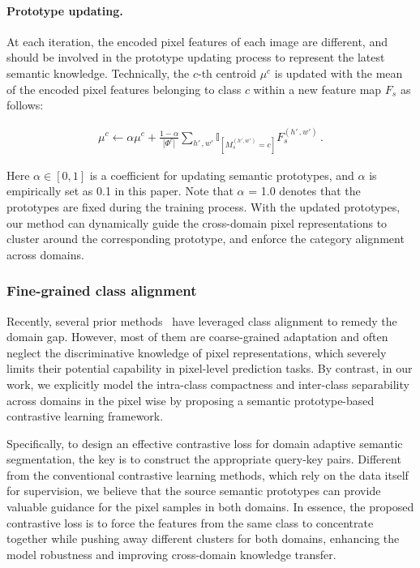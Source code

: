 \documentclass[runningheads]{llncs}
\begin{document}
\paragraph{Prototype updating.} At each iteration, the encoded pixel features of each image are different, and should be involved in the prototype updating process to represent the latest semantic knowledge. Technically, the $c$-th centroid $\mu^c$ is updated with the mean of the encoded pixel features belonging to class $c$ within a new feature map $F_{s}$ as follows:\begin{small}
\end{small}\begin{small}
    \begin{align}
        \mu^c \leftarrow \alpha \mu^c + \frac{1 - \alpha}{|\Phi^c|} \sum_{h'\,, w'} \mathbb{I}_{[M_s^{(h',w')}=c]} F_{s}^{(h'\,, w')}\,.
        \label{eq:semantic_prototype_update}
    \end{align}
\end{small}Here $\alpha \in [0,1]$ is a coefficient for updating semantic prototypes, and $\alpha$ is empirically set as 0.1 in this paper. Note that $\alpha$ = 1.0 denotes that the prototypes are fixed during the training process. With the updated prototypes, our method can dynamically guide the cross-domain pixel representations to cluster around the corresponding prototype, and enforce the category alignment across domains.

\subsubsection{Fine-grained class alignment}
\label{sec:alignment}
Recently, several prior methods~\cite{du2019ssf-dan,luo2019taking,wang2020differential,zhang2019category,pixmatch2021_CVPR} have leveraged class alignment to remedy the domain gap. However, most of them are coarse-grained adaptation and often neglect the discriminative knowledge of pixel representations, which severely limits their potential capability in pixel-level prediction tasks. By contrast, in our work, we explicitly model the intra-class compactness and inter-class separability across domains in the pixel wise by proposing a semantic prototype-based contrastive learning framework. 


Specifically, to design an effective contrastive loss for domain adaptive semantic segmentation, the key is to construct the appropriate query-key pairs. Different from the conventional contrastive learning methods, which rely on the data itself for supervision, we believe that the source semantic prototypes can provide valuable guidance for the pixel samples in both domains. In essence, the proposed contrastive loss is to force the features from the same class to concentrate together while pushing away different clusters for both domains, enhancing the model robustness and improving cross-domain knowledge transfer. 
\end{document}
